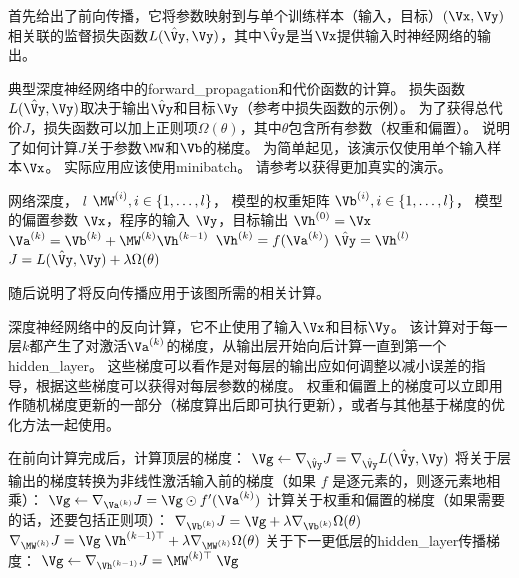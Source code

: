 首先给出了前向传播，它将参数映射到与单个训练样本（输入，目标）$(\Vx,\Vy)$相关联的监督损失函数$L(\hat{\Vy}, \Vy)$，其中$\hat{\Vy}$是当$\Vx$提供输入时神经网络的输出。
\begin{algorithm}[ht]
\caption{典型深度神经网络中的\gls{forward_propagation}和代价函数的计算。
损失函数$L(\hat{\Vy}, \Vy)$取决于输出$\hat{\Vy}$和目标$\Vy$（参考中损失函数的示例）。
为了获得总代价$J$，损失函数可以加上正则项$\Omega(\theta)$，其中$\theta$包含所有参数（权重和偏置）。
说明了如何计算$J$关于参数$\MW$和$\Vb$的梯度。 为简单起见，该演示仅使用单个输入样本$\Vx$。
实际应用应该使用\gls{minibatch}。
请参考以获得更加真实的演示。}
\label{alg:mlp-fprop}
\begin{algorithmic}
\REQUIRE 网络深度， $l$
\REQUIRE $\MW^{(i)}, i \in \{ 1, \dots, l\}$， 模型的权重矩阵
\REQUIRE $\Vb^{(i)}, i \in \{ 1, \dots, l\}$， 模型的偏置参数
\REQUIRE $\Vx$，程序的输入
\REQUIRE $\Vy$，目标输出
\STATE $\Vh^{(0)}=\Vx$
 \STATE $\Va^{(k)} = \Vb^{(k)} + \MW^{(k)} \Vh^{(k-1)}$
 \STATE $\Vh^{(k)} = f(\Va^{(k)})$
\ENDFOR
\STATE $\hat{\Vy} = \Vh^{(l)}$
\STATE $J = L(\hat{\Vy},\Vy) + \lambda \Omega(\theta)$
\end{algorithmic}
\end{algorithm}

随后说明了将反向传播应用于该图所需的相关计算。
\begin{algorithm}[htbp]
\caption{深度神经网络中的反向计算，它不止使用了输入$\Vx $和目标$\Vy$。
该计算对于每一层$k$都产生了对激活$\Va^{(k)}$的梯度，从输出层开始向后计算一直到第一个\gls{hidden_layer}。
这些梯度可以看作是对每层的输出应如何调整以减小误差的指导，根据这些梯度可以获得对每层参数的梯度。
权重和偏置上的梯度可以立即用作随机梯度更新的一部分（梯度算出后即可执行更新），或者与其他基于梯度的优化方法一起使用。
}
\label{alg:mlp-bprop}
\begin{algorithmic}
\STATE 在前向计算完成后，计算顶层的梯度：
\STATE $\Vg \leftarrow \nabla_{\hat{\Vy}} J = \nabla_{\hat{\Vy}} L(\hat{\Vy},\Vy)$
\STATE 将关于层输出的梯度转换为非线性激活输入前的梯度（如果 $f$ 是逐元素的，则逐元素地相乘）：
  \STATE $\Vg \leftarrow \nabla_{\Va^{(k)}} J = \Vg \odot f'(\Va^{(k)})$
  \STATE 计算关于权重和偏置的梯度（如果需要的话，还要包括正则项）：
  \STATE $\nabla_{\Vb^{(k)}} J = \Vg + \lambda \nabla_{\Vb^{(k)}} \Omega(\theta)$
  \STATE $\nabla_{\MW^{(k)}} J = \Vg \; \Vh^{(k-1)\top} + \lambda \nabla_{\MW^{(k)}} \Omega(\theta)$
  \STATE 关于下一更低层的\gls{hidden_layer}传播梯度：
  \STATE $\Vg \leftarrow \nabla_{\Vh^{(k-1)}} J = \MW^{(k)\top} \; \Vg$
\ENDFOR
\end{algorithmic}
\end{algorithm}

